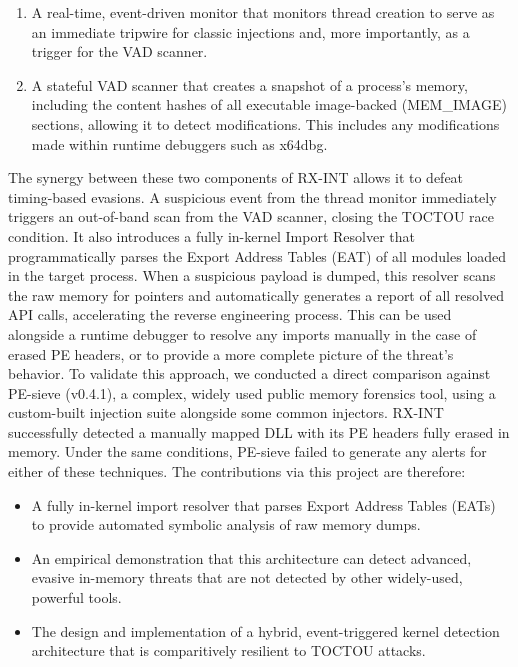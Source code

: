 \documentclass[journal]{IEEEtran}
\begin{document}
\begin{enumerate}
\item A real-time, event-driven monitor that monitors thread creation to serve as an immediate tripwire for classic injections and, more importantly, as a trigger for the VAD scanner.
\item A stateful VAD scanner that creates a snapshot of a process's memory, including the content hashes of all executable image-backed (MEM\_IMAGE) sections, allowing it to detect modifications. This includes any modifications made within runtime debuggers such as x64dbg.
\end{enumerate}
The synergy between these two components of RX-INT allows it to defeat timing-based evasions. A suspicious event from the thread monitor immediately triggers an out-of-band scan from the VAD scanner, closing the TOCTOU race condition. It also introduces a fully in-kernel Import Resolver that programmatically parses the Export Address Tables (EAT) of all modules loaded in the target process. When a suspicious payload is dumped, this resolver scans the raw memory for pointers and automatically generates a report of all resolved API calls, accelerating the reverse engineering process. This can be used alongside a runtime debugger to resolve any imports manually in the case of erased PE headers, or to provide a more complete picture of the threat's behavior.
To validate this approach, we conducted a direct comparison against PE-sieve (v0.4.1), a complex, widely used public memory forensics tool, using a custom-built injection suite alongside some common injectors. RX-INT successfully detected a manually mapped DLL with its PE headers fully erased in memory. Under the same conditions, PE-sieve failed to generate any alerts for either of these techniques.
The contributions via this project are therefore:
\begin{itemize}
    \item A fully in-kernel import resolver that parses Export Address Tables (EATs) to provide automated symbolic analysis of raw memory dumps.
    \item An empirical demonstration that this architecture can detect advanced, evasive in-memory threats that are not detected by other widely-used, powerful tools.
    \item The design and implementation of a hybrid, event-triggered kernel detection architecture that is comparitively resilient to TOCTOU attacks.
\end{itemize}
\end{document}
